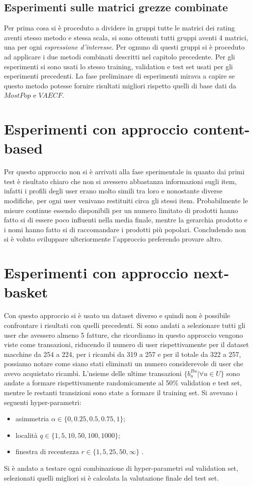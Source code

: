 \subsection{Esperimenti sulle matrici grezze combinate}
Per prima cosa si è proceduto a dividere in gruppi tutte le matrici dei rating aventi stesso metodo e stessa scala, si sono ottenuti tutti gruppi aventi 4 matrici, una per ogni \textit{espressione d'interesse}. Per ognuno di questi gruppi si è proceduto ad applicare i due metodi combinati descritti nel capitolo precedente. Per gli esperimenti si sono usati lo stesso training, validation e test set usati per gli esperimenti precedenti. La fase preliminare di esperimenti mirava a capire se questo metodo potesse fornire risultati migliori rispetto quelli di base dati da $MostPop$ e $VAECF$.

\section{Esperimenti con approccio content-based}
Per questo approccio non si è arrivati alla fase sperimentale in quanto dai primi test è risultato chiaro che non si avessero abbastanza informazioni sugli item, infatti i profili degli user erano molto simili tra loro e nonostante diverse modifiche, per ogni user venivano restituiti circa gli stessi item. Probabilmente le misure continue essendo disponibili per un numero limitato di prodotti hanno fatto si di essere poco influenti nella media finale, mentre la gerarchia prodotto e i nomi hanno fatto si di raccomandare i prodotti più popolari. Concludendo non si è voluto sviluppare ulteriormente l'approccio preferendo provare altro.

\section{Esperimenti con approccio next-basket}
Con questo approccio si è usato un dataset diverso e quindi non è possibile confrontare i risultati con quelli precedenti. Si sono andati a selezionare tutti gli user che avessero almeno 5 fatture, che ricordiamo in questo approccio vengono viste come transazioni, riducendo il numero di user rispettivamente per il dataset macchine da 254 a 224, per i ricambi da 319 a 257 e per il totale da 322 a 257, possiamo notare come siano stati eliminati un numero considerevole di user che avevo acquistato ricambi. L'nsieme delle ultime transazioni $\{b_{u}^{Bu}| \forall u \in U\}$ sono andate a formare rispettivamente randomicamente al 50\% validation e test set, mentre le restanti transizioni sono state a formare il training set. 
\newpage
Si avevano i seguenti hyper-parametri:
\begin{itemize}
    \item asimmetria $\alpha \in \{0, 0.25, 0.5, 0.75, 1\}$;
    \item località $q \in \{1, 5, 10, 50, 100, 1000\}$;
    \item finestra di recentezza $r \in \{1, 5, 25, 50, \infty \}$ .
\end{itemize}

Si è andato a testare ogni combinazione di hyper-parametri sul validation set, selezionati quelli migliori si è calcolata la valutazione finale del test set.